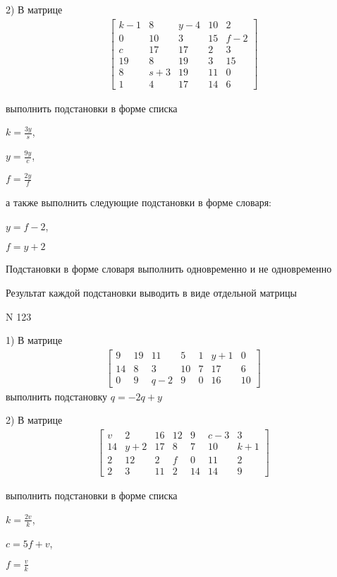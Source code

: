 \documentclass[11pt]{report}
\begin{document}
    2) В матрице
\begin{align*}
\left[\begin{matrix}k - 1 & 8 & y - 4 & 10 & 2\\0 & 10 & 3 & 15 & f - 2\\c & 17 & 17 & 2 & 3\\19 & 8 & 19 & 3 & 15\\8 & s + 3 & 19 & 11 & 0\\1 & 4 & 17 & 14 & 6\end{matrix}\right]
\end{align*}

выполнить подстановки в форме списка

$k=\frac{3 y}{s}$,

$y=\frac{9 y}{c}$,

$f=\frac{2 y}{f}$

а также выполнить следующие подстановки в форме словаря:

$y=f - 2$,

$f=y + 2$


    Подстановки в форме словаря выполнить одновременно и не одновременно


    Результат каждой подстановки выводить в виде отдельной матрицы

\newpage
N 123


    1) В матрице
\begin{align*}
\left[\begin{matrix}9 & 19 & 11 & 5 & 1 & y + 1 & 0\\14 & 8 & 3 & 10 & 7 & 17 & 6\\0 & 9 & q - 2 & 9 & 0 & 16 & 10\end{matrix}\right]
\end{align*}
выполнить подстановку $q=- 2 q + y$


    2) В матрице
\begin{align*}
\left[\begin{matrix}v & 2 & 16 & 12 & 9 & c - 3 & 3\\14 & y + 2 & 17 & 8 & 7 & 10 & k + 1\\2 & 12 & 2 & f & 0 & 11 & 2\\2 & 3 & 11 & 2 & 14 & 14 & 9\end{matrix}\right]
\end{align*}

выполнить подстановки в форме списка

$k=\frac{2 v}{k}$,

$c=5 f + v$,

$f=\frac{v}{k}$
\end{document}
